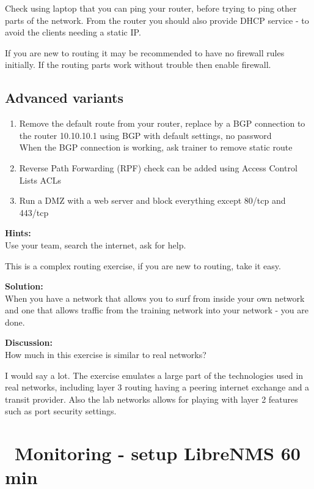 \documentclass[a4paper,11pt,notitlepage]{report}
\begin{document}
Check using laptop that you can ping your router, before trying to ping other parts of the network. From the router you should also provide DHCP service - to avoid the clients needing a static IP.

If you are new to routing it may be recommended to have no firewall rules initially. If the routing parts work without trouble then enable firewall.

\section*{Advanced variants}
\begin{enumerate}
\item Remove the default route from your router, replace by a BGP connection to the router 10.10.10.1 using BGP with default settings, no password\\
When the BGP connection is working, ask trainer to remove static route
\item Reverse Path Forwarding (RPF) check can be added using Access Control Lists ACLs
\item Run a DMZ with a web server and block everything except 80/tcp and 443/tcp
\end{enumerate}


{\bf Hints:}\\
Use your team, search the internet, ask for help.

This is a complex routing exercise, if you are new to routing, take it easy.

{\bf Solution:}\\
When you have a network that allows you to surf from inside your own network and one that allows traffic from the training network into your network - you are done.

{\bf Discussion:}\\
How much in this exercise is similar to real networks?

I would say a lot. The exercise emulates a large part of the technologies used in real networks, including layer 3 routing having a peering internet exchange and a transit provider. Also the lab networks allows for playing with layer 2 features such as port security settings.

\chapter{\faInfoCircle\ Monitoring - setup LibreNMS 60 min}
\label{ex:librenms-setup}
\end{document}
